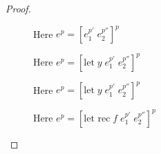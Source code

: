 \documentclass[../../master.tex]{subfiles}
\begin{document}
\begin{proof}
\begin{description}
		\item[] Here $e^p=[e_1^{p'}\;e_2^{p''}]^p$ 

		\item[] Here $e^p=[\mbox{let}\;y\;e_1^{p'}\;e_2^{p''}]^p$

		\item[] Here $e^p=[\mbox{let}\;y\;e_1^{p'}\;e_2^{p''}]^p$

		\item[] Here $e^p=[\mbox{let rec}\;f\;e_1^{p'}\;e_2^{p''}]^p$
	\end{description}
\end{proof}
\end{document}
